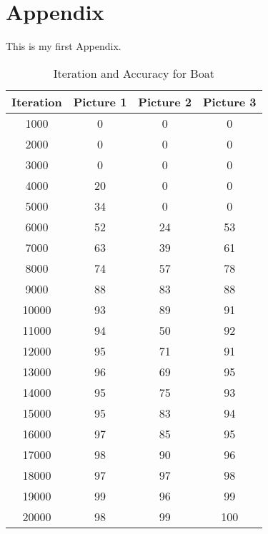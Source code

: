 \appendix
\chapter{Appendix}
\label{appendix}
This is my first Appendix.




\begin{table}[h!]
\centering
\begin{tabular}{|c|c|c|c|}
\hline
\textbf{Iteration} & \textbf{Picture 1} & \textbf{Picture 2} & \textbf{Picture 3} \\
\hline
1000 & 0 & 0 & 0 \\
2000 & 0 & 0 & 0 \\
3000 & 0 & 0 & 0 \\
4000 & 20 & 0 & 0 \\
5000 & 34 & 0 & 0 \\
6000 & 52 & 24 & 53 \\
7000 & 63 & 39 & 61 \\
8000 & 74 & 57 & 78 \\
9000 & 88 & 83 & 88 \\
10000 & 93 & 89 & 91 \\
11000 & 94 & 50 & 92 \\
12000 & 95 & 71 & 91 \\
13000 & 96 & 69 & 95 \\
14000 & 95 & 75 & 93 \\
15000 & 95 & 83 & 94 \\
16000 & 97 & 85 & 95 \\
17000 & 98 & 90 & 96 \\
18000 & 97 & 97 & 98 \\
19000 & 99 & 96 & 99 \\
20000 & 98 & 99 & 100 \\
\hline
\end{tabular}
\caption{Iteration and Accuracy for Boat}
\end{table}

